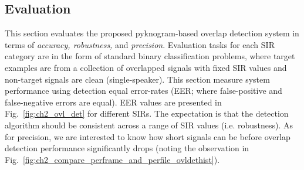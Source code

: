 {\newpage

\subsection{Evaluation}
\label{ssec:exp_pykno}

This section evaluates the proposed pyknogram-based overlap detection system in terms of {\it accuracy, robustness,} and {\it precision}. 
Evaluation tasks for each SIR category are in the form of standard binary classification problems, where target examples are from a collection of overlapped signals with fixed SIR values and non-target signals are clean (single-speaker). 
This section measure system performance using detection equal error-rates (EER; where false-positive and false-negative errors are equal). 
EER values are presented in Fig.~\ref{fig:ch2_ovl_det} for different SIRs. 
The expectation is that the detection algorithm should be consistent across a range of SIR values (i.e. robustness). 
As for precision, we are interested to know how short signals can be before overlap detection performance significantly drops (noting the observation in Fig.~\ref{fig:ch2_compare_perframe_and_perfile_ovldethist}). 


\vspace{3mm}
}
